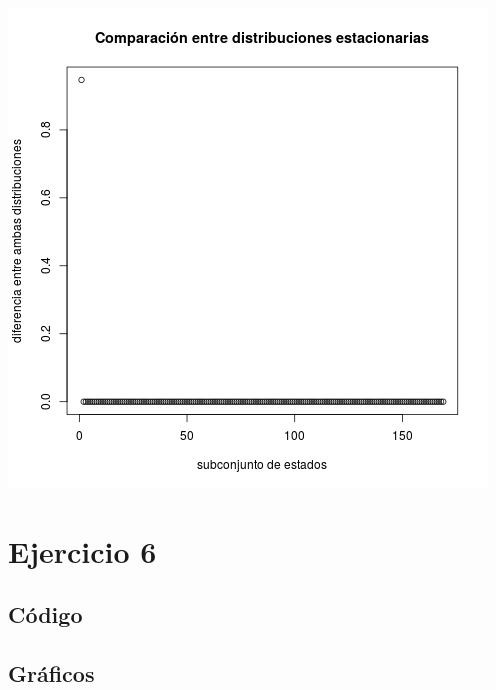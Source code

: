 \documentclass[paper=letter, fontsize=12pt]{scrartcl} %
\numberwithin{equation}{section} %
\numberwithin{figure}{section} %
\numberwithin{table}{section} %
\begin{document}
\includegraphics[scale=0.5]{ej3_4.png}

\section{Ejercicio 6}

\subsection{Código}



\subsection{Gráficos}
\end{document}
